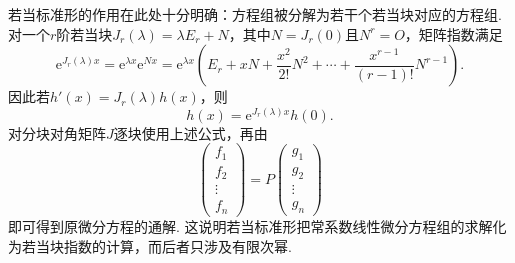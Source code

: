 若当标准形的作用在此处十分明确：方程组被分解为若干个若当块对应的方程组. 对一个$r$阶若当块$J_r(\lambda)=\lambda E_r+N$，其中$N=J_r(0)$且$N^r=O$，矩阵指数满足
\[
    \mathrm{e}^{J_r(\lambda)x}
    =\mathrm{e}^{\lambda x}\mathrm{e}^{Nx}
    =\mathrm{e}^{\lambda x}\left(E_r+xN+\frac{x^2}{2!}N^2+\cdots+\frac{x^{r-1}}{(r-1)!}N^{r-1}\right).
\]
因此若$h'(x)=J_r(\lambda)h(x)$，则
\[
    h(x)=\mathrm{e}^{J_r(\lambda)x}h(0).
\]
对分块对角矩阵$J$逐块使用上述公式，再由
\[
    \begin{pmatrix}
        f_1 \\ f_2 \\ \vdots \\ f_n
    \end{pmatrix}
    =P\begin{pmatrix}
        g_1 \\ g_2 \\ \vdots \\ g_n
    \end{pmatrix}
\]
即可得到原微分方程的通解. 这说明若当标准形把常系数线性微分方程组的求解化为若当块指数的计算，而后者只涉及有限次幂.

